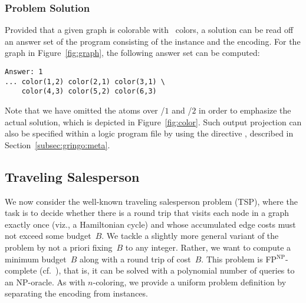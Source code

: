 \subsubsection{Problem Solution}\label{subsec:color:solution}


Provided that a given graph is colorable with~ colors,
a solution can be read off an answer set of the program consisting
of the instance and the encoding.
For the graph in Figure~\ref{fig:graph},
the following answer set can be computed:%
%
\begin{lstlisting}[numbers=none]
Answer: 1
... color(1,2) color(2,1) color(3,1) \
    color(4,3) color(5,2) color(6,3)
\end{lstlisting}
%
Note that we have omitted the atoms over
/$1$ and
/$2$ in order to emphasize the actual solution,
which is depicted in Figure~\ref{fig:color}.
Such output projection can also be specified within a logic program file by using the directive ,
described in Section~\ref{subsec:gringo:meta}.

\subsection{Traveling Salesperson}\label{subsec:ex:tsp}

We now consider the well-known traveling salesperson problem (TSP),
where the task is to decide whether there is a round trip that visits
each node in a graph exactly once (viz., a Hamiltonian cycle) and whose
accumulated edge costs must not exceed some budget~$B$.
We tackle a slightly more general variant of the problem by not
a priori fixing~$B$ to any integer.
Rather,
we want to compute a minimum budget~$B$ along with a round trip of cost~$B$.
This problem is FP$^\textrm{NP}$-complete (cf.~\cite{papadimitriou94a}),
that is, it can be solved with a polynomial number of queries to an NP-oracle.
As with $n$-coloring,
we provide a uniform problem definition by separating the encoding from instances.

